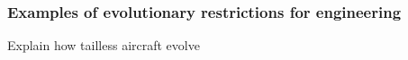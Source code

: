\documentclass{beamer}
\begin{document}

\begin{frame}
\frametitle{Examples of evolutionary restrictions for engineering}

Explain how tailless aircraft evolve

\end{frame}
\end{document}
